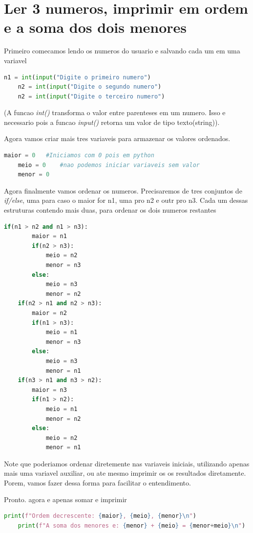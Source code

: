 \documentclass{article}
\begin{document}
\section{Ler 3 numeros, imprimir em ordem e a soma dos dois menores}

Primeiro comecamos lendo os numeros do usuario e salvando cada um em uma variavel

    \begin{lstlisting}[language=Python]
    n1 = int(input("Digite o primeiro numero")
    n2 = int(input("Digite o segundo numero")
    n2 = int(input("Digite o terceiro numero")\end{lstlisting}

(A funcao \textit{int()} transforma o valor entre parenteses em um numero. Isso e necessario pois a funcao \textit{input()} retorna um valor de tipo texto(string)).

Agora vamos criar mais tres variaveis para armazenar os valores ordenados.

\begin{lstlisting}[language=Python]
    maior = 0   #Iniciamos com 0 pois em python
    meio = 0    #nao podemos iniciar variaveis sem valor
    menor = 0\end{lstlisting}


Agora finalmente vamos ordenar os numeros. Precisaremos de tres conjuntos de \textit{if/else}, uma para caso o maior for n1, uma pro n2 e outr pro n3. Cada um dessas estruturas contendo mais duas, para ordenar os dois numeros restantes


\begin{lstlisting}[language=Python]
    if(n1 > n2 and n1 > n3):
        maior = n1
        if(n2 > n3):
            meio = n2
            menor = n3
        else:
            meio = n3
            menor = n2
    if(n2 > n1 and n2 > n3):
        maior = n2
        if(n1 > n3):
            meio = n1
            menor = n3
        else:
            meio = n3
            menor = n1
    if(n3 > n1 and n3 > n2):
        maior = n3
        if(n1 > n2):
            meio = n1
            menor = n2
        else:
            meio = n2
            menor = n1\end{lstlisting}

Note que poderiamos ordenar diretemente nas variaveis iniciais, utilizando apenas mais uma variavel auxiliar, ou ate mesmo imprimir os os resultados diretamente. Porem, vamos fazer dessa forma para facilitar o entendimento.

Pronto. agora e apenas somar e imprimir 

\begin{lstlisting}[language=Python]
    print(f"Ordem decrescente: {maior}, {meio}, {menor}\n")
    print(f"A soma dos menores e: {menor} + {meio} = {menor+meio}\n")\end{lstlisting}
\end{document}
